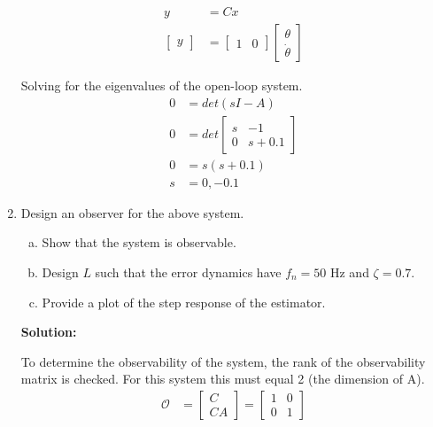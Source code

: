 \documentclass[11pt]{article}
\newcommand{\solution}{\textbf{Solution: \\}}
\begin{document}
\begin{enumerate}[label=\textbf{\arabic*.}]
  \begin{equation}
    \begin{split}
      y &= Cx \\
      \begin{bmatrix}
        y
      \end{bmatrix}
      &=
      \begin{bmatrix}
        1 & 0
      \end{bmatrix}
      \begin{bmatrix}
        \theta \\ \dot{\theta}
      \end{bmatrix}
    \end{split}
  \end{equation}

  Solving for the eigenvalues of the open-loop system.
  \begin{equation}
    \begin{split}
      0 &= det(sI - A) \\
      0 &= det
      \begin{bmatrix}
        s & -1 \\ 0 & s+0.1
      \end{bmatrix} \\
      0 &= s(s+0.1) \\
      s &= 0, -0.1
    \end{split}
  \end{equation}

  \vspace{24pt}
  \item Design an observer for the above system.
  \begin{enumerate}[(a)]
    \itemsep -6pt
    \item Show that the system is observable.
    \item Design $L$ such that the error dynamics have $f_n=50$ Hz and $\zeta=0.7$.
    \item Provide a plot of the step response of the estimator.
  \end{enumerate}
  \solution

  To determine the observability of the system, the rank of the observability 
  matrix is checked. For this system this must equal 2 (the dimension of A).
  \begin{equation}
    \begin{split}
      \mathcal{O} &= 
      \begin{bmatrix}
        C \\ CA
      \end{bmatrix}
      = 
      \begin{bmatrix}
        1 & 0 \\ 0 & 1
      \end{bmatrix}
    \end{split}
  \end{equation}


\end{enumerate}
\end{document}
